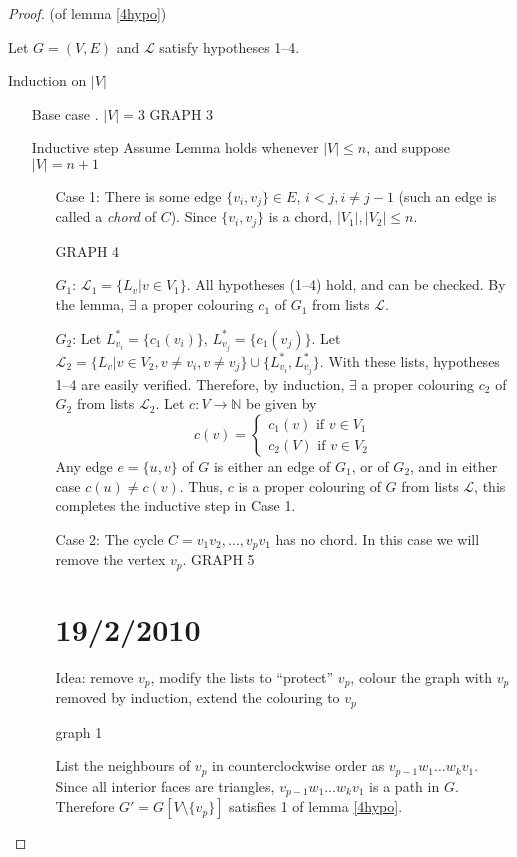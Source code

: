 \documentclass{article}
\begin{document}
\begin{proof}(of lemma \ref{4hypo})

Let $G=(V,E)$ and $\mathcal{L}$ satisfy hypotheses 1--4.

Induction on $|V|$
\begin{itemize}
\item[Base case]. $|V| = 3$ GRAPH 3
\item[Inductive step]  Assume Lemma holds whenever $|V| \leq n$, and suppose $|V| = n+1$
\begin{itemize}
\item[Case 1:] There is some edge $\{v_i,v_j\} \in E$, $i <j, i \neq j-1$ (such an edge is called a \emph{chord} of $C$).  Since $\{v_i, v_j\}$ is a chord, $|V_1|, |V_2| \leq n$.

GRAPH 4

$G_1$: $\mathcal{L}_1 = \{L_v | v \in V_1\}$. All hypotheses (1--4) hold, and can be checked.  By the lemma, $\exists$ a proper colouring $c_1$ of $G_1$ from lists $\mathcal{L}$.

$G_2$: Let $L_{v_i}^* = \{ c_1(v_i)\}$, $L_{v_j}^* = \{ c_1(v_j)\}$.  Let $\mathcal{L}_2 = \{L_v | v \in V_2, v \neq v_i, v \neq v_j\} \cup \{L_{v_i}^*,L_{v_j}^*\}$.  With these lists, hypotheses 1--4 are easily verified.  Therefore, by induction, $\exists$ a proper colouring $c_2$ of $G_2$ from lists $\mathcal{L}_2$.  Let $c: V \rightarrow \mathbb{N}$ be given by 
\[c(v) = \left\{ \begin{array}{l}
c_1(v) \text{ if } v \in V_1 \\
c_2(V) \text{ if } v \in V_2
\end{array} \right.
\]
Any edge $e = \{u,v\}$ of $G$ is either an edge of $G_1$, or of $G_2$, and in either case $c(u) \neq c(v)$.  Thus, $c$ is a proper colouring of $G$ from lists $\mathcal{L}$, this completes the inductive step in Case 1.
\item[Case 2:] The cycle $C = v_1 v_2, \ldots, v_p v_1$ has no chord.  In this case we will remove the vertex $v_p$. GRAPH 5

\section*{19/2/2010}

Idea: remove $v_p$, modify the lists to ``protect'' $v_p$, colour the graph with $v_p$ removed by induction, extend the colouring to $v_p$

graph 1

List the neighbours of $v_p$ in counterclockwise order as $v_{p-1} w_1 \dots w_k v_1$.  Since all interior faces are triangles, $v_{p-1} w_1 \ldots w_k v_1$ is a path in $G$.  Therefore $G' = G[V\setminus \{v_p\}]$ satisfies 1 of lemma \ref{4hypo}.


\end{itemize}
\end{itemize}
\end{proof}
\end{document}
